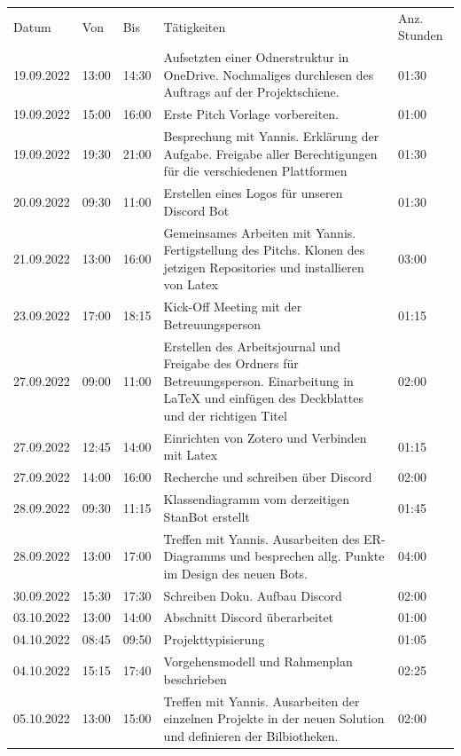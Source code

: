 \documentclass[a4paper, table]{article}
\begin{document}
\begin{longtable}[h]{|l|l|l|p{20em}|l|}
    \hline
    \rowcolor[gray]{.9} Datum & Von & Bis & Tätigkeiten & Anz. Stunden  \\
    19.09.2022 & 13:00 & 14:30 & Aufsetzten einer Odnerstruktur in OneDrive. Nochmaliges durchlesen des Auftrags auf der Projektschiene. & 01:30 \\
    19.09.2022 & 15:00 & 16:00 & Erste Pitch Vorlage   vorbereiten. & 01:00  \\
    19.09.2022 & 19:30 & 21:00 & Besprechung mit Yannis. Erklärung der Aufgabe.   Freigabe aller Berechtigungen für die verschiedenen Plattformen & 01:30 \\
    20.09.2022 & 09:30 & 11:00 & Erstellen eines Logos für unseren Discord Bot & 01:30 \\
    21.09.2022 & 13:00 & 16:00 & Gemeinsames Arbeiten mit Yannis. Fertigstellung des   Pitchs. Klonen des jetzigen Repositories und installieren von Latex & 03:00 \\
    23.09.2022 & 17:00 & 18:15 & Kick-Off Meeting mit der Betreuungsperson & 01:15 \\
    27.09.2022 & 09:00 & 11:00 & Erstellen des Arbeitsjournal und Freigabe des   Ordners für Betreuungsperson. Einarbeitung in LaTeX und einfügen des   Deckblattes und der richtigen Titel & 02:00 \\
    27.09.2022 & 12:45 & 14:00 & Einrichten von Zotero und Verbinden mit Latex & 01:15 \\
    27.09.2022 & 14:00 & 16:00 & Recherche und schreiben über Discord & 02:00 \\
    28.09.2022 & 09:30 & 11:15 & Klassendiagramm vom derzeitigen StanBot erstellt & 01:45 \\
    28.09.2022 & 13:00 & 17:00 & Treffen mit Yannis. Ausarbeiten des ER-Diagramms   und besprechen allg. Punkte im Design des neuen Bots. & 04:00 \\
    30.09.2022 & 15:30 & 17:30 & Schreiben Doku. Aufbau   Discord & 02:00 \\
    03.10.2022 & 13:00 & 14:00 & Abschnitt Discord   überarbeitet & 01:00 \\
    04.10.2022 & 08:45 & 09:50 & Projekttypisierung & 01:05 \\
    04.10.2022 & 15:15 & 17:40 & Vorgehensmodell und   Rahmenplan beschrieben & 02:25  \\
    05.10.2022 & 13:00 & 15:00 & Treffen mit Yannis. Ausarbeiten der einzelnen   Projekte in der neuen Solution und definieren der Bilbiotheken. & 02:00 \\

\end{longtable}
\end{document}
